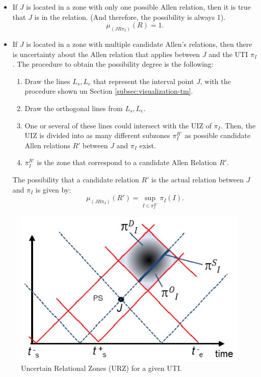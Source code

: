 \begin{itemize}
 \item If $J$ is located in a zone with only one possible Allen relation, then it is true that $J$ is in the relation. (And therefore, the possibility is always 1).
\begin{equation}
 \label{eq:possibility-iz-uti-certain}
\mu_{\left(J R \pi_I \right)} \left(R \right) = 1.
\end{equation}


\item If $J$ is located in a zone with multiple candidate Allen's relations, then there is uncertainty about the Allen relation that applies between $J$ and the UTI $\pi_I$. The procedure to obtain the possibility degree is the following:

\begin{enumerate}
 \item Draw the lines $L_s, L_e$ that represent the interval point $J$, with the procedure shown un Section \ref{subsec:visualization-tm}. 
\item Draw the orthogonal lines from $L_s, L_e$. 
\item One or several of these lines could intersect with the UIZ of $\pi_I$. Then, the UIZ is divided into as many different subzones $\pi_I^{R'}$ as possible candidate Allen relations $R'$ between $J$ and $\pi_I$ exist.
\item $\pi_I^{R'}$ is the zone that correspond to a candidate Allen Relation $R'$.
\end{enumerate}
The possibility that a candidate relation $R'$ is the actual relation between $J$ and $\pi_I$ is given by:
\begin{equation}
 \label{eq:possibility-iz-uti}
\mu_{\left(J R \pi_I \right)} \left(R' \right) = \sup_{I \in \pi_I^{R'}} \pi_I(I).
\end{equation}
\end{itemize}

\begin{figure}[h]
   \centering
   \includegraphics[width=0.8\columnwidth]{graphs/calculation.eps}
   \caption{Uncertain Relational Zones (URZ) for a given UTI.  }
   \label{fig:calculation}
 \end{figure}

